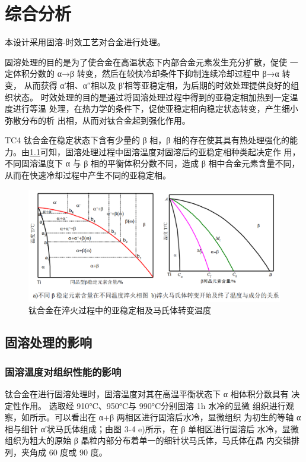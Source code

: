 \chapter{综合分析}


本设计采用固溶-时效工艺对合金进行处理。

固溶处理的目的是为了使合金在高温状态下内部合金元素发生充分扩散，促使 一定体积分数的 α→β 转变，然后在较快冷却条件下抑制连续冷却过程中 β→α 转变， 从而获得 α′相、α′′相以及 β′相等亚稳定相，为后期的时效处理提供良好的组织状态。 时效处理的目的是通过将固溶处理过程中得到的亚稳定相加热到一定温度进行等温 处理，在热力学的条件下，促使亚稳定相向稳定状态转变，产生细小弥散分布的析 出相，从而对钛合金起到强化作用。

TC4 钛合金在稳定状态下含有少量的 β 相，β 相的存在使其具有热处理强化的能 力。由\ref{fig:tc4change}可知，固溶处理过程中固溶温度对固溶后的亚稳定相种类起决定作 用，不同固溶温度下 α 与 β 相的平衡体积分数不同，造成 β 相中合金元素含量不同， 从而在快速冷却过程中产生不同的亚稳定相。
\begin{figure}[h!]
	\centering
	\includegraphics[width=0.7\linewidth]{pic/tc4change}
	\caption{钛合金在淬火过程中的亚稳定相及马氏体转变温度}
	\label{fig:tc4change}
\end{figure}
\section{固溶处理的影响}
\subsection{固溶温度对组织性能的影响}
钛合金在进行固溶处理时，固溶温度对其在高温平衡状态下 α 相体积分数具有 决定性作用。
选取经 910°C、950°C与 990°C分别固溶 1h 水冷的显微 组织进行观察，如所示。可以看出在 α+β 两相区进行固溶后水冷，显微组织 为初生的等轴 α 相与细针 α′状马氏体组成；由图 3-4 e)所示，在 β 单相区进行固溶后 水冷，显微组织为粗大的原始 β 晶粒内部分布着单一的细针状马氏体，马氏体在晶 内交错排列，夹角成 60 度或 90 度。

